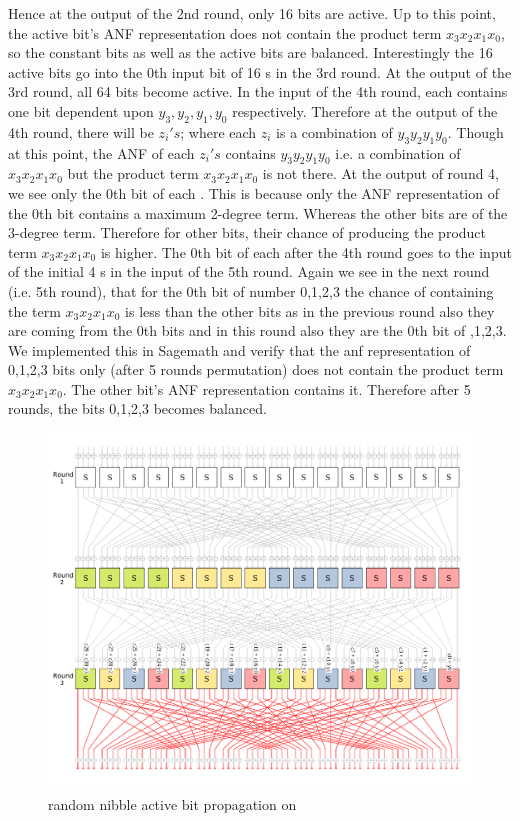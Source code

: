 Hence at the output of the 2nd round, only 16 bits are active. Up to this point, the active bit's ANF representation does not contain the product term $x_3x_2x_1x_0$, so the constant bits as well as the active bits are balanced. Interestingly the 16 active bits go into the 0th input bit of 16 \sbb s in the 3rd round. At the output of the 3rd round, all 64 bits become active. In the input of the 4th round, each \sbb contains one bit dependent upon $y_3, y_2, y_1, y_0$ respectively. Therefore at the output of the 4th round, there will be $z_i's$; where each $z_i$ is a combination of $y_3y_2y_1y_0$. Though at this point, the ANF of each $z_i's$ contains $y_3y_2y_1y_0$ i.e. a combination of $x_3x_2x_1x_0$ but the product term $x_3x_2x_1x_0$ is not there. At the output of round 4, we see only the 0th bit of each \sbb. This is because only the ANF representation of the 0th bit contains a maximum 2-degree term. Whereas the other bits are of the 3-degree term. Therefore for other bits, their chance of producing the product term $x_3x_2x_1x_0$ is higher. The 0th bit of each \sbb after the 4th round goes to the input of the initial 4 \sbb s in the input of the 5th round. Again we see in the next round (i.e. 5th round), that for the 0th bit of \sbb number 0,1,2,3 the chance of containing the term $x_3x_2x_1x_0$ is less than the other bits as in the previous round also they are coming from the 0th bits and in this round also they are the 0th bit of ,1,2,3. We implemented this in Sagemath and verify that the anf representation of 0,1,2,3 bits only (after 5 rounds permutation) does not contain the product term $x_3x_2x_1x_0$. The other bit's ANF representation contains it. Therefore after 5 rounds, the bits 0,1,2,3 becomes balanced. 



\begin{figure}[!h]
	\centering
	\includegraphics[width=\linewidth]{fig/present_cipher_active_bit_propagation_random_nibble.pdf}
	\caption{random nibble active bit propagation on \present}
	\label{fig:present_active_bit_propagation_random_nibble}
\end{figure}


